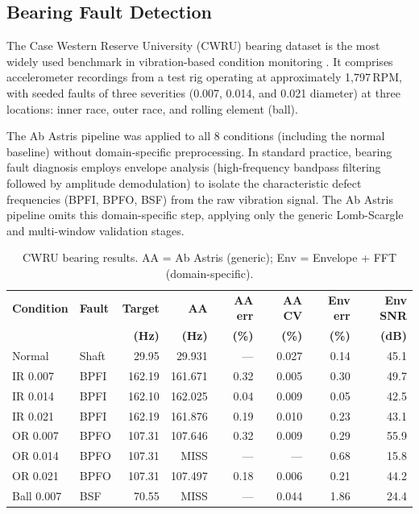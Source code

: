 \documentclass[11pt,a4paper]{article}
\begin{document}
\subsection{Bearing Fault Detection}
\label{sec:bearings}

The Case Western Reserve University (CWRU) bearing dataset is the most widely used benchmark in vibration-based condition monitoring \citep{Smith2015}. It comprises accelerometer recordings from a test rig operating at approximately 1{,}797\,RPM, with seeded faults of three severities (0.007\textquotedbl{}, 0.014\textquotedbl{}, and 0.021\textquotedbl{}{} diameter) at three locations: inner race, outer race, and rolling element (ball).

The Ab Astris pipeline was applied to all 8 conditions (including the normal baseline) without domain-specific preprocessing. In standard practice, bearing fault diagnosis employs envelope analysis (high-frequency bandpass filtering followed by amplitude demodulation) to isolate the characteristic defect frequencies (BPFI, BPFO, BSF) from the raw vibration signal. The Ab Astris pipeline omits this domain-specific step, applying only the generic Lomb-Scargle and multi-window validation stages.

\begin{table}[htbp]
\centering
\caption{CWRU bearing results. AA = Ab Astris (generic); Env = Envelope + FFT (domain-specific).}
\label{tab:cwru}
\smallskip
\small
\begin{tabular}{llrrrrrr}
\toprule
\textbf{Condition} & \textbf{Fault} & \textbf{Target} & \textbf{AA} & \textbf{AA err} & \textbf{AA CV} & \textbf{Env err} & \textbf{Env SNR} \\
                   &                & \textbf{(Hz)}   & \textbf{(Hz)} & \textbf{(\%)} & \textbf{(\%)} & \textbf{(\%)} & \textbf{(dB)} \\
\midrule
Normal      & Shaft & 29.95  & 29.931  & ---  & 0.027 & 0.14 & 45.1 \\
IR 0.007\textquotedbl{} & BPFI & 162.19 & 161.671 & 0.32 & 0.005 & 0.30 & 49.7 \\
IR 0.014\textquotedbl{} & BPFI & 162.10 & 162.025 & 0.04 & 0.009 & 0.05 & 42.5 \\
IR 0.021\textquotedbl{} & BPFI & 162.19 & 161.876 & 0.19 & 0.010 & 0.23 & 43.1 \\
OR 0.007\textquotedbl{} & BPFO & 107.31 & 107.646 & 0.32 & 0.009 & 0.29 & 55.9 \\
OR 0.014\textquotedbl{} & BPFO & 107.31 & MISS    & ---  & ---   & 0.68 & 15.8 \\
OR 0.021\textquotedbl{} & BPFO & 107.31 & 107.497 & 0.18 & 0.006 & 0.21 & 44.2 \\
Ball 0.007\textquotedbl{} & BSF & 70.55 & MISS    & ---  & 0.044 & 1.86 & 24.4 \\
\bottomrule
\end{tabular}
\end{table}
\end{document}
